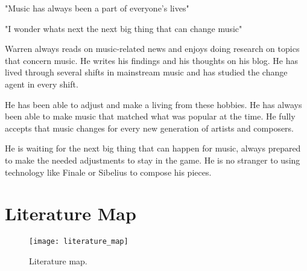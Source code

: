 "Music has always been a part of everyone's lives" 

"I wonder whats next the next big thing that can change music" 

Warren always reads on music-related news and enjoys doing research on topics that concern music. He writes his findings and his thoughts on his blog. He has lived through several shifts in mainstream music and has studied the change agent in every shift. 

He has been able to adjust and make a living from these hobbies. He has always been able to make music that matched what was popular at the time. He fully accepts that music changes for every new generation of artists and composers.

He is waiting for the next big thing that can happen for music, always prepared to make the needed adjustments to stay in the game. He is no stranger to using technology like Finale or Sibelius to compose his pieces.

\begin{comment}
\chapter{Resource Persons}
\label{sec:appendixf}

\newcommand{\resperson}[4]{\textbf{#1} \\ #2 \\ #3 \\ \url{#4}\vspace{0.5em}\\}

\resperson{Mr. Jordan Aiko Deja}{Adviser}{College of Computer Studies\\De La Salle University-Manila}{jordan.deja@dlsu.edu.ph}
\\
\resperson{Dr. Rafael Cabredo}{Chair, Software Technology Department}{College of Computer Studies\\De La Salle University-Manila}{rafael.cabredo@dlsu.edu.ph}

\end{comment}

\chapter{Literature Map}
\label{sec:appendixe}


\begin{sidewaysfigure}[h]
	\texttt{[image: literature\_map]}
    \caption{Literature map.}
    \label{fig:literature-map}
\end{sidewaysfigure}

